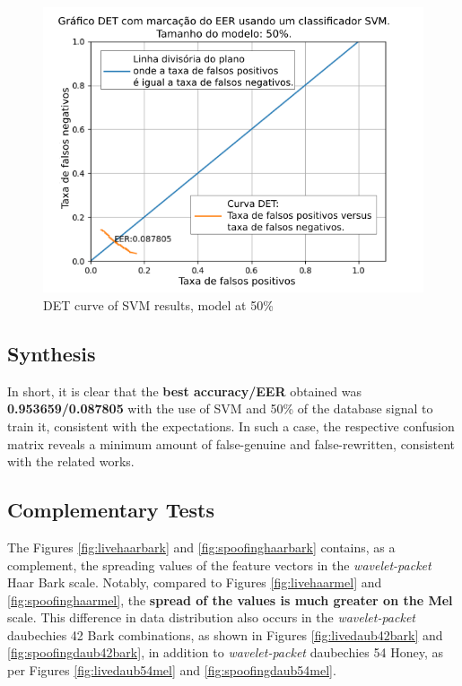 \begin{figure}[!h]
	\centering
	\includegraphics[width=.9\linewidth]{images/results/det/DET_SVM_50}
	\caption{DET curve of SVM results, model at 50\%}
	\label{fig:detsvm50}
\end{figure}

\subsection{Synthesis}

\par In short, it is clear that the \textbf{best accuracy/EER} obtained was \textbf{0.953659/0.087805} with the use of SVM and 50\% of the database signal to train it, consistent with the expectations. In such a case, the respective confusion matrix reveals a minimum amount of false-genuine and false-rewritten, consistent with the related works.


\subsection{Complementary Tests}
\label{chap:testsResults:sec:Experimento05}

\par The Figures \ref{fig:livehaarbark} and \ref{fig:spoofinghaarbark} contains, as a complement, the spreading values of the feature vectors in the \textit{wavelet-packet} Haar Bark scale. Notably, compared to Figures \ref{fig:livehaarmel} and \ref{fig:spoofinghaarmel}, the \textbf{spread of the values is much greater on the Mel} scale. This difference in data distribution also occurs in the \textit{wavelet-packet} daubechies 42 Bark combinations, as shown in Figures \ref{fig:livedaub42bark} and \ref{fig:spoofingdaub42bark}, in addition to \textit{wavelet-packet} daubechies 54 Honey, as per Figures \ref{fig:livedaub54mel} and \ref{fig:spoofingdaub54mel}.

